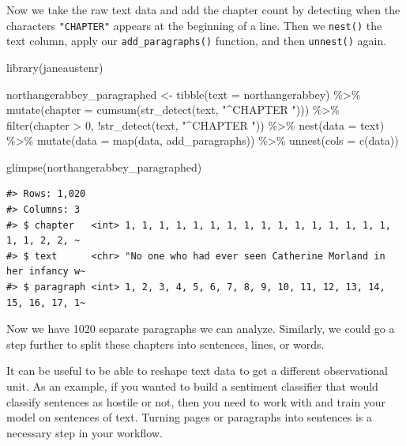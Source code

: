 \documentclass[
]{krantz}
\makeatletter
\newenvironment{Shaded}{\begin{snugshade}}{\end{snugshade}}
\newcommand{\AttributeTok}[1]{\textcolor[rgb]{0.77,0.63,0.00}{#1}}
\newcommand{\DecValTok}[1]{\textcolor[rgb]{0.00,0.00,0.81}{#1}}
\newcommand{\FunctionTok}[1]{\textcolor[rgb]{0.00,0.00,0.00}{#1}}
\newcommand{\NormalTok}[1]{#1}
\newcommand{\OtherTok}[1]{\textcolor[rgb]{0.56,0.35,0.01}{#1}}
\newcommand{\SpecialCharTok}[1]{\textcolor[rgb]{0.00,0.00,0.00}{#1}}
\newcommand{\StringTok}[1]{\textcolor[rgb]{0.31,0.60,0.02}{#1}}
\newenvironment{kframe}{%
\medskip{}
\setlength{\fboxsep}{.8em}
 \def\at@end@of@kframe{}%
 \ifinner\ifhmode%
  \def\at@end@of@kframe{\end{minipage}}%
  \begin{minipage}{\columnwidth}%
 \fi\fi%
 \def\FrameCommand##1{\hskip\@totalleftmargin \hskip-\fboxsep
 \colorbox{shadecolor}{##1}\hskip-\fboxsep
     \hskip-\linewidth \hskip-\@totalleftmargin \hskip\columnwidth}%
 \MakeFramed {\advance\hsize-\width
   \@totalleftmargin\z@ \linewidth\hsize
   \@setminipage}}%
 {\par\unskip\endMakeFramed%
 \at@end@of@kframe}
\renewenvironment{Shaded}{\begin{kframe}}{\end{kframe}}
\makeatother
\begin{document}
Now we take the raw text data and add the chapter count by detecting when the characters \texttt{"CHAPTER"} appears at the beginning of a line. Then we \texttt{nest()} the text column, apply our \texttt{add\_paragraphs()} function, and then \texttt{unnest()} again.

\begin{Shaded}
\begin{Highlighting}[]
\FunctionTok{library}\NormalTok{(janeaustenr)}

\NormalTok{northangerabbey\_paragraphed }\OtherTok{\textless{}{-}} \FunctionTok{tibble}\NormalTok{(}\AttributeTok{text =}\NormalTok{ northangerabbey) }\SpecialCharTok{\%\textgreater{}\%}
  \FunctionTok{mutate}\NormalTok{(}\AttributeTok{chapter =} \FunctionTok{cumsum}\NormalTok{(}\FunctionTok{str\_detect}\NormalTok{(text, }\StringTok{"\^{}CHAPTER "}\NormalTok{))) }\SpecialCharTok{\%\textgreater{}\%}
  \FunctionTok{filter}\NormalTok{(chapter }\SpecialCharTok{\textgreater{}} \DecValTok{0}\NormalTok{,}
         \SpecialCharTok{!}\FunctionTok{str\_detect}\NormalTok{(text, }\StringTok{"\^{}CHAPTER "}\NormalTok{)) }\SpecialCharTok{\%\textgreater{}\%}
  \FunctionTok{nest}\NormalTok{(}\AttributeTok{data =}\NormalTok{ text) }\SpecialCharTok{\%\textgreater{}\%}
  \FunctionTok{mutate}\NormalTok{(}\AttributeTok{data =} \FunctionTok{map}\NormalTok{(data, add\_paragraphs)) }\SpecialCharTok{\%\textgreater{}\%}
  \FunctionTok{unnest}\NormalTok{(}\AttributeTok{cols =} \FunctionTok{c}\NormalTok{(data))}

\FunctionTok{glimpse}\NormalTok{(northangerabbey\_paragraphed)}
\end{Highlighting}
\end{Shaded}

\begin{verbatim}
#> Rows: 1,020
#> Columns: 3
#> $ chapter   <int> 1, 1, 1, 1, 1, 1, 1, 1, 1, 1, 1, 1, 1, 1, 1, 1, 1, 1, 2, 2, ~
#> $ text      <chr> "No one who had ever seen Catherine Morland in her infancy w~
#> $ paragraph <int> 1, 2, 3, 4, 5, 6, 7, 8, 9, 10, 11, 12, 13, 14, 15, 16, 17, 1~
\end{verbatim}

Now we have 1020 separate paragraphs we can analyze. Similarly, we could go a step further to split these chapters into sentences, lines, or words.

It can be useful to be able to reshape text data to get a different observational unit. As an example, if you wanted to build a sentiment classifier that would classify sentences as hostile or not, then you need to work with and train your model on sentences of text. Turning pages or paragraphs into sentences is a necessary step in your workflow.
\end{document}
